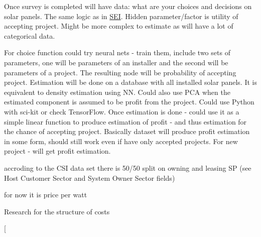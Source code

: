
\begin{DoxyRefList}
\item[\label{wp__wp000001}%
\hypertarget{wp__wp000001}{}%
Class \hyperlink{classsolar__core_1_1_household}{solar\+\_\+core\+:\+:Household} ]Once survey is completed will have data\+: what are your choices and decisions on solar panels. The same logic as in \hyperlink{classsolar__core_1_1_s_e_i}{S\+E\+I}. Hidden parameter/factor is utility of accepting project. Might be more complex to estimate as will have a lot of categorical data. 
\item[\label{wp__wp000004}%
\hypertarget{wp__wp000004}{}%
Class \hyperlink{classsolar__core_1_1_s_e_i}{solar\+\_\+core\+:\+:S\+E\+I} ]For choice function could try neural nets -\/ train them, include two sets of parameters, one will be parameters of an installer and the second will be parameters of a project. The resulting node will be probability of accepting project. Estimation will be done on a database with all installed solar panels. It is equivalent to density estimation using N\+N. Could also use P\+C\+A when the estimated component is assumed to be profit from the project. Could use Python with sci-\/kit or check Tensor\+Flow. Once estimation is done -\/ could use it as a simple linear function to produce estimation of profit -\/ and thus estimation for the chance of accepting project. Basically dataset will produce profit estimation in some form, should still work even if have only accepted projects. For new project -\/ will get profit estimation. 
\item[\label{wp__wp000003}%
\hypertarget{wp__wp000003}{}%
Member \hyperlink{classsolar__core_1_1_s_e_i_a807561ad055ddc0df91b80ba406ee6df}{solar\+\_\+core\+:\+:S\+E\+I\+:\+:form\+\_\+design} (std\+::shared\+\_\+ptr$<$ P\+V\+Project $>$ project\+\_\+)]accroding to the C\+S\+I data set there is 50/50 split on owning and leasing S\+P (see Host Customer Sector and System Owner Sector fields) 
\item[\label{wp__wp000002}%
\hypertarget{wp__wp000002}{}%
Member \hyperlink{classsolar__core_1_1_s_e_i_ad532ca9d30d5988e051b75e33ce6c241}{solar\+\_\+core\+:\+:S\+E\+I\+:\+:form\+\_\+online\+\_\+quote} (std\+::shared\+\_\+ptr$<$ P\+V\+Project $>$ project\+\_\+)]for now it is price per watt  
\item[\label{wp__wp000005}%
\hypertarget{wp__wp000005}{}%
Class \hyperlink{classsolar__core_1_1_s_e_m}{solar\+\_\+core\+:\+:S\+E\+M} ]Research for the structure of costs 
\item[\label{wp__wp000006}%
\hypertarget{wp__wp000006}{}%

\end{DoxyRefList}
